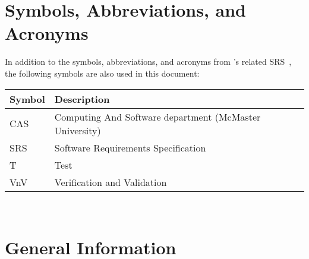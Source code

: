 \documentclass[12pt, titlepage]{article}
\begin{document}
\newpage

\tableofcontents

\newpage{}

\listoftables


\newpage

\section{Symbols, Abbreviations, and Acronyms}

In addition to the symbols, abbreviations, and acronyms from \progname{}'s
related SRS~\cite{BalaciBeamBendingSRS2023}, the following symbols are also used
in this document:\\

\renewcommand{\arraystretch}{1.2}
\begin{tabular}{l l}
    \toprule
    \textbf{Symbol} & \textbf{Description}                                    \\
    \midrule
    CAS             & Computing And Software department (McMaster University) \\
    SRS             & Software Requirements Specification                     \\
    T               & Test                                                    \\
    VnV             & Verification and Validation                             \\
    \bottomrule
\end{tabular}\\

\newpage



\section{General Information}
\end{document}
